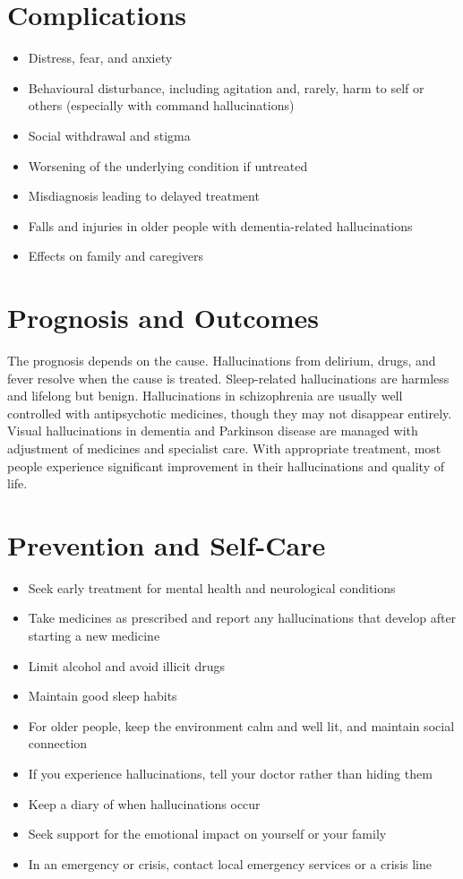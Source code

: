 \section*{Complications}
\begin{itemize}
    \item Distress, fear, and anxiety
    \item Behavioural disturbance, including agitation and, rarely, harm to self or others (especially with command hallucinations)
    \item Social withdrawal and stigma
    \item Worsening of the underlying condition if untreated
    \item Misdiagnosis leading to delayed treatment
    \item Falls and injuries in older people with dementia-related hallucinations
    \item Effects on family and caregivers
\end{itemize}

\section*{Prognosis and Outcomes}
The prognosis depends on the cause. Hallucinations from delirium, drugs, and fever resolve when the cause is treated. Sleep-related hallucinations are harmless and lifelong but benign. Hallucinations in schizophrenia are usually well controlled with antipsychotic medicines, though they may not disappear entirely. Visual hallucinations in dementia and Parkinson disease are managed with adjustment of medicines and specialist care. With appropriate treatment, most people experience significant improvement in their hallucinations and quality of life.

\section*{Prevention and Self-Care}
\begin{itemize}
    \item Seek early treatment for mental health and neurological conditions
    \item Take medicines as prescribed and report any hallucinations that develop after starting a new medicine
    \item Limit alcohol and avoid illicit drugs
    \item Maintain good sleep habits
    \item For older people, keep the environment calm and well lit, and maintain social connection
    \item If you experience hallucinations, tell your doctor rather than hiding them
    \item Keep a diary of when hallucinations occur
    \item Seek support for the emotional impact on yourself or your family
    \item In an emergency or crisis, contact local emergency services or a crisis line
\end{itemize}


